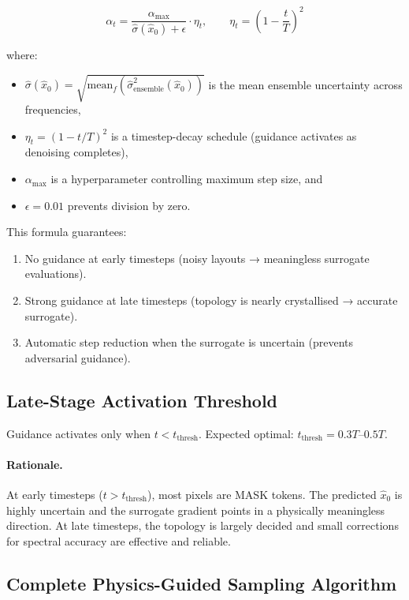 \documentclass[12pt,a4paper]{article}
\newcommand{\tthresh}{t_{\mathrm{thresh}}}
\newcommand{\alphamax}{\alpha_{\max}}
\newcommand{\sigmahat}{\hat{\sigma}}
\theoremstyle{definition}
\theoremstyle{plain}
\theoremstyle{remark}
\begin{document}
\begin{equation}
  \alpha_t
  = \frac{\alphamax}{\sigmahat(\hat{x}_0) + \epsilon}
    \cdot \eta_t,
  \qquad
  \eta_t = \left(1 - \frac{t}{T}\right)^2
  \label{eq:alpha_t}
\end{equation}

where:
\begin{itemize}
  \item $\sigmahat(\hat{x}_0) = \sqrt{\mathrm{mean}_f(\hat{\sigma}^2_{\mathrm{ensemble}}(\hat{x}_0))}$
        is the mean ensemble uncertainty across frequencies,
  \item $\eta_t = (1 - t/T)^2$ is a timestep-decay schedule (guidance activates as
        denoising completes),
  \item $\alphamax$ is a hyperparameter controlling maximum step size, and
  \item $\epsilon = 0.01$ prevents division by zero.
\end{itemize}

This formula guarantees:
\begin{enumerate}
  \item No guidance at early timesteps (noisy layouts → meaningless surrogate evaluations).
  \item Strong guidance at late timesteps (topology is nearly crystallised → accurate surrogate).
  \item Automatic step reduction when the surrogate is uncertain (prevents adversarial guidance).
\end{enumerate}

\subsection{Late-Stage Activation Threshold}

Guidance activates only when $t < \tthresh$.
Expected optimal: $\tthresh = 0.3T$--$0.5T$.

\paragraph{Rationale.}
At early timesteps ($t > \tthresh$), most pixels are MASK tokens.
The predicted $\hat{x}_0$ is highly uncertain and the surrogate gradient points in a
physically meaningless direction.
At late timesteps, the topology is largely decided and small corrections for spectral
accuracy are effective and reliable.

\subsection{Complete Physics-Guided Sampling Algorithm}
\end{document}
